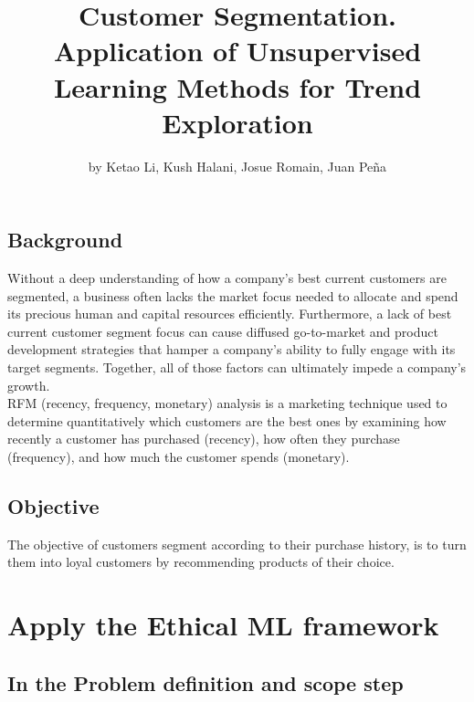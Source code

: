 \title{Customer Segmentation. Application of Unsupervised Learning Methods for
Trend Exploration}
\author{by Ketao Li, Kush Halani, Josue Romain, Juan Peña}

\maketitle


\hypertarget{background}{%
\subsection{Background}\label{background}}

Without a deep understanding of how a company's best current customers
are segmented, a business often lacks the market focus needed to
allocate and spend its precious human and capital resources efficiently.
Furthermore, a lack of best current customer segment focus can cause
diffused go-to-market and product development strategies that hamper a
company's ability to fully engage with its target segments. Together,
all of those factors can ultimately impede a company's growth.\\
RFM (recency, frequency, monetary) analysis is a marketing technique
used to determine quantitatively which customers are the best ones by
examining how recently a customer has purchased (recency), how often
they purchase (frequency), and how much the customer spends (monetary).

\hypertarget{objective}{%
\subsection{Objective}\label{objective}}

The objective of customers segment according to their purchase history,
is to turn them into loyal customers by recommending products of their
choice.

\hypertarget{apply-the-ethical-ml-framework}{%
\section{Apply the Ethical ML
framework}\label{apply-the-ethical-ml-framework}}

\hypertarget{in-the-problem-definition-and-scope-step}{%
\subsection{In the Problem definition and scope
step}\label{in-the-problem-definition-and-scope-step}}

